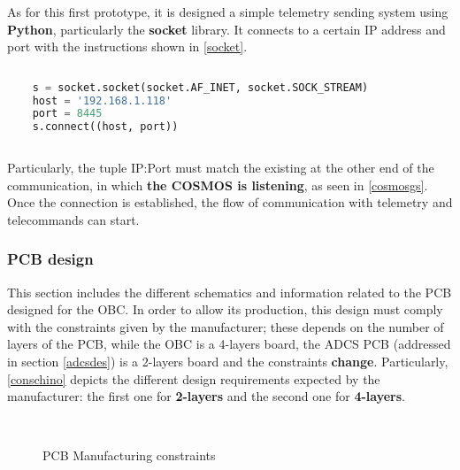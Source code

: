 As for this first prototype, it is designed a simple telemetry sending system using \textbf{Python}, particularly the \textbf{socket} library. It connects to a certain IP address and port with the instructions shown in \autoref{socket}. 


\begin{lstlisting}[language=Python, caption=Connection to server using the \textbf{socket} library, label=socket]
  
	s = socket.socket(socket.AF_INET, socket.SOCK_STREAM)
	host = '192.168.1.118'
	port = 8445
	s.connect((host, port)) 	
	
\end{lstlisting}

Particularly, the tuple IP:Port must match the existing at the other end of the communication, in which \textbf{the COSMOS  is listening}, as seen in \autoref{cosmosgs}. Once the connection is established, the flow of communication with telemetry and telecommands can start. %

\subsubsection{PCB design}

This section includes the different schematics and information related to the \acrshort{PCB} designed for the \acrshort{OBC}. In order to allow its production, this design must comply with the constraints given by the manufacturer; these depends on the number of layers of the \acrshort{PCB}, while the \acrshort{OBC} is a 4-layers board, the \acrshort{ADCS} \acrshort{PCB} (addressed in section \ref{adcsdes}) is a 2-layers board and the constraints \textbf{change}. Particularly, \autoref{conschino} depicts the different design requirements expected by the manufacturer: the first one for \textbf{2-layers} and the second one for\textbf{ 4-layers}.

			\begin{figure}[H]
			\centering
			\\
			\caption{\acrshort{PCB} Manufacturing constraints \cite{pablotesis}} \label{conschino}
			\vspace{-1cm}
\end{figure}

